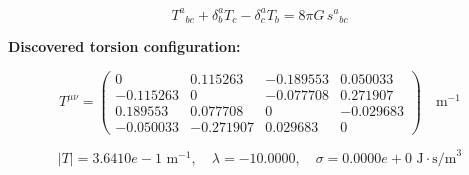 
\begin{equation}
  T^a{}_{bc} + \delta^a_b T_c - \delta^a_c T_b = 8\pi G \, s^a{}_{bc}
\end{equation}

\textbf{Discovered torsion configuration:}

\begin{equation}
  T^{\mu\nu} = \begin{pmatrix}
    0 & 0.115263 & -0.189553 & 0.050033 \\
    -0.115263 & 0 & -0.077708 & 0.271907 \\
    0.189553 & 0.077708 & 0 & -0.029683 \\
    -0.050033 & -0.271907 & 0.029683 & 0
  \end{pmatrix} \quad \text{m}^{-1}
\end{equation}

\begin{equation}
  |T| = 3.6410e-1 \text{ m}^{-1}, \quad
  \lambda = -10.0000, \quad
  \sigma = 0.0000e+0 \text{ J}\cdot\text{s/m}^3
\end{equation}